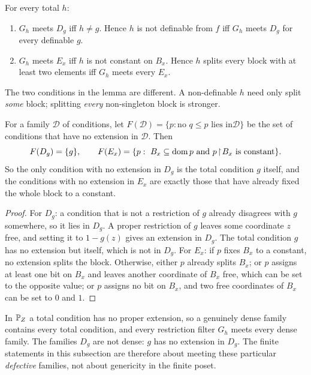 \begin{lemma}\label{lem:meeting}
For every total $h$:
\begin{enumerate}\itemsep0pt
\item $G_h$ meets $D_g$ iff $h\ne g$. Hence $h$ is not definable from $f$ iff $G_h$ meets $D_g$
for every definable $g$.
\item $G_h$ meets $E_x$ iff $h$ is not constant on $B_x$. Hence $h$ splits every block with at
least two elements iff $G_h$ meets every $E_x$.
\end{enumerate}
\end{lemma}

The two conditions in the lemma are different. A non-definable $h$ need only split \emph{some}
block; splitting \emph{every} non-singleton block is stronger.

\begin{theorem}\label{thm:densitydefect}
For a family $\mathcal D$ of conditions, let $F(\mathcal D)=\{p:\text{no }q\le p\text{ lies in
}\mathcal D\}$ be the set of conditions that have no extension in $\mathcal D$. Then
\[
  F(D_g)=\{g\},\qquad
  F(E_x)=\{p:\ B_x\subseteq\operatorname{dom} p\text{ and }p\!\upharpoonright\! B_x\text{ is constant}\}.
\]
So the only condition with no extension in $D_g$ is the total condition $g$ itself, and the
conditions with no extension in $E_x$ are exactly those that have already fixed the whole block to
a constant.
\end{theorem}

\begin{proof}
For $D_g$: a condition that is not a restriction of $g$ already disagrees with $g$ somewhere, so
it lies in $D_g$. A proper restriction of $g$ leaves some coordinate $z$ free, and setting it to
$1-g(z)$ gives an extension in $D_g$. The total condition $g$ has no extension but itself, which
is not in $D_g$. For $E_x$: if $p$ fixes $B_x$ to a constant, no extension splits the block.
Otherwise, either $p$ already splits $B_x$; or $p$ assigns at least one bit on $B_x$ and leaves
another coordinate of $B_x$ free, which can be set to the opposite value; or $p$ assigns no bit on
$B_x$, and two free coordinates of $B_x$ can be set to $0$ and $1$.
\end{proof}

\begin{remark}\label{rem:finitegeneric}
In $\mathbb{P}_Z$ a total condition has no proper extension, so a genuinely dense family contains
every total condition, and every restriction filter $G_h$ meets every dense family. The families
$D_g$ are not dense: $g$ has no extension in $D_g$. The finite statements in this subsection are therefore about meeting
these particular \emph{defective} families, not about genericity in the finite poset.
\end{remark}

